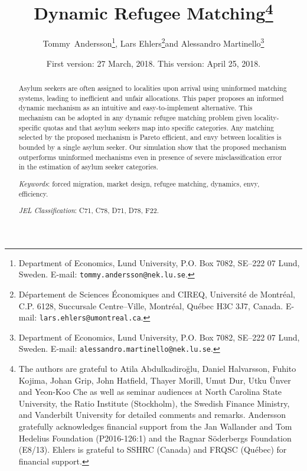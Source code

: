 \documentclass[12pt,fleqn]{article}
\begin{document}
\title{\textbf{Dynamic Refugee Matching}\footnote{The authors are grateful to Atila Abdulkadiro\u{g}lu, Daniel Halvarsson, Fuhito Kojima, Johan Grip, John Hatfield, Thayer Morill, Umut Dur, Utku \"{U}nver and Yeon-Koo Che as well as seminar audiences at North Carolina State University, the Ratio Institute (Stockholm), the Swedish Finance Ministry, and Vanderbilt University for detailed comments and remarks. Andersson gratefully acknowledges financial support from the Jan Wallander and Tom Hedelius Foundation (P2016-126:1) and the Ragnar S\"oderbergs Foundation (E8/13). Ehlers is grateful to SSHRC (Canada) and FRQSC (Qu\'{e}bec) for financial support.}}

\author{Tommy~Andersson\footnote{Department of Economics, Lund University, P.O. Box 7082, SE--222 07 Lund, Sweden. E-mail: \texttt{tommy.andersson@nek.lu.se}.}, Lars Ehlers\footnote{D\'epartement de Sciences \'Economiques and CIREQ, Universit\'e de Montr\'eal, C.P. 6128, Succursale Centre--Ville, Montr\'eal, Qu\'ebec H3C
3J7, Canada. E-mail: \texttt{lars.ehlers@umontreal.ca}.}\space\space and Alessandro Martinello\footnote{Department of Economics, Lund University, P.O. Box 7082, SE--222 07 Lund, Sweden. E-mail: \texttt{alessandro.martinello@nek.lu.se}.}}

\date{\small{First version: 27 March, 2018. This version: April 25, 2018.}}

\maketitle
\vspace*{-4mm}
\begin{abstract}
\noindent Asylum seekers are often assigned to localities upon arrival using uninformed matching systems, leading to inefficient and unfair allocations. This paper proposes an informed dynamic mechanism as an intuitive and easy-to-implement alternative. This mechanism can be adopted in any dynamic refugee matching problem given locality-specific quotas and that asylum seekers map into specific categories. Any matching selected by the proposed mechanism is Pareto efficient, and envy between localities is bounded by a single asylum seeker. Our simulation show that the proposed mechanism outperforms uninformed mechanisms even in presence of severe misclassification error in the estimation of asylum seeker categories.

\medskip

\noindent\emph{Keywords}: forced migration, market design, refugee matching, dynamics, envy, efficiency.

\medskip

\noindent\emph{JEL Classification}: C71, C78, D71, D78, F22.

\end{abstract}
\end{document}
